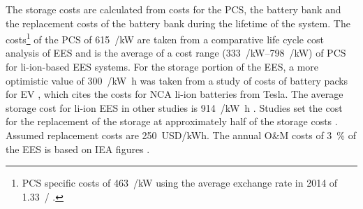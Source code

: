 
The storage costs are calculated from costs for the \ac{PCS}, the battery bank and the replacement costs of the battery bank during the lifetime of the system. The costs\footnote{\ac{PCS} specific costs of \SI{463}{\eur/\kilo\watt} \cite{Zakeri2015} using the average exchange rate in 2014 of \SI{1.33}{\usd/\eur} \cite{StatistaGmbH2015}.} of the \ac{PCS} of \SI{615}{\usd/\kilo\watt} are taken from a comparative life cycle cost analysis of \ac{EES} \cite{Zakeri2015} and is the average of a cost range (\SIrange{333}{798}{\usd/\kilo\watt}) of \ac{PCS} for \ac{li-ion}-based \ac{EES} systems. For the storage portion of the \ac{EES}, a more optimistic value of \SI{300}{\usd/\kilo\watt\hour} was taken from a study of costs of battery packs for \ac{EV} \cite{Nykvist2015}, which cites the costs for \ac{NCA} \ac{li-ion} batteries from Tesla. The average storage cost for \ac{li-ion} \ac{EES} in other studies is \SI{914}{\usd/\kilo\watt\hour} \cite{Zakeri2015}. Studies set the cost for the replacement of the storage at approximately half of the storage costs \cite{Zakeri2015}. Assumed replacement costs are \SI{250}{USD/kWh}. The annual \ac{O&M} costs of \SI{3}{\percent} of the \ac{EES} is based on \ac{IEA} figures \cite{IEA2014c}.

